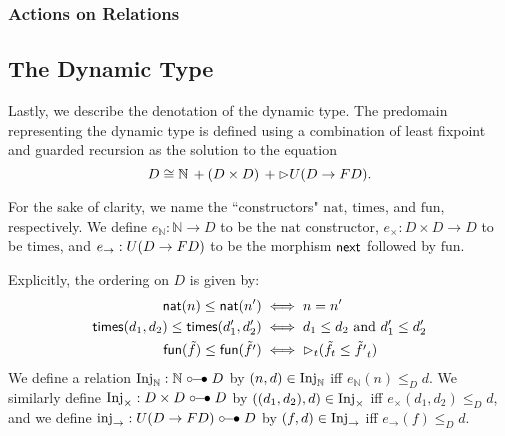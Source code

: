 \subsubsection{Actions on Relations}








\subsection{The Dynamic Type}
Lastly, we describe the denotation of the dynamic type. The predomain
representing the dynamic type is defined using a combination of least fixpoint
and guarded recursion as the solution to the equation
%
\[ D \cong \mathbb{N}\, + (D \times D)\, + {{\vartriangleright}} U(D \to FD). \]
%

For the sake of clarity, we name the ``constructors" $\text{nat}$,
$\text{times}$, and $\text{fun}$, respectively.
%
We define $e_\mathbb{N} : \mathbb{N} \to D$ to be the $\text{nat}$ constructor,
$e_\times : D \times D \to D$ to be $\text{times}$, and $e_\to : U(D \to F D)$
to be the morphism $\mathsf{next}$ followed by $\text{fun}$.

Explicitly, the ordering on $D$ is given by:
%
\begin{align*}
    \mathsf{nat}(n) \le \mathsf{nat}(n') 
        &\iff n = n' \\
    \mathsf{times} (d_1, d_2) \le \mathsf{times} (d_1', d_2')
        &\iff d_1 \le d_2 \text{ and } d_1' \le d_2'\\
    \mathsf{fun}(\tilde{f}) \le \mathsf{fun}(\tilde{f'}) 
        &\iff {\vartriangleright}_t(\tilde{f}_t \le \tilde{f'}_t)
\end{align*}
%
We define a relation $\text{Inj}_\mathbb{N} : \mathbb{N} \mathrel{\circ\mkern-6mu-\mkern-6mu\bullet} D$ by $(n, d) \in \text{Inj}_\mathbb{N}$ iff
$e_\mathbb{N}(n) \le_D d$. We similarly define $\text{Inj}_\times : D \times D \mathrel{\circ\mkern-6mu-\mkern-6mu\bullet} D$ by
$((d_1, d_2), d) \in \text{Inj}_\times$ iff $e_\times(d_1, d_2) \le_D d$, and we define
$\text{inj}_\to : U(D \to F D) \mathrel{\circ\mkern-6mu-\mkern-6mu\bullet} D$ by $(f, d) \in \text{Inj}_\to$ iff $e_\to(f)
\le_D d$.

